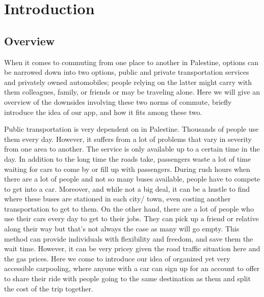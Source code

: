 \documentclass[a4paper, 12pt]{article} %
\begin{document}
    \indent \section{Introduction } %
        \subsection{Overview}
            When it comes to commuting from one place to another in Palestine, options can be narrowed down into two options, public and private transportation services and privately owned automobiles; people relying on the latter might carry with them colleagues, family, or friends or may be traveling alone.  Here we will give an overview of the downsides involving these two norms of commute, briefly introduce the idea of our app, and how it fits among these two.

            Public transportation is very dependent on in Palestine. Thousands of people use them every day. However, it suffers from a lot of problems that vary in severity from one area to another. The service is only available up to a certain time in the day. In addition to the long time the roads take, passengers waste a lot of time waiting for cars to come by or fill up with passengers. During rush hours when there are a lot of people and not so many buses available, people have to compete to get into a car. Moreover, and while not a big deal, it can be a hustle to find where these buses are stationed in each city/ town, even costing another transportation to get to them. On the other hand, there are a lot of people who use their cars every day to get to their jobs. They can pick up a friend or relative along their way but that's not always the case as many will go empty. This method can provide individuals with flexibility and freedom, and save them the wait time. However, it can be very pricey given the road traffic situation here and the gas prices. Here we come to introduce our idea of organized yet very accessible carpooling, where anyone with a car can sign up for an account to offer to share their ride with people going to the same destination as them and split the cost of the trip together. 
\end{document}
